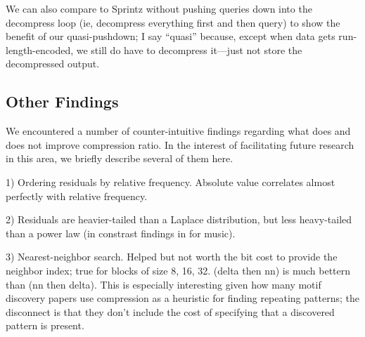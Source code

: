We can also compare to Sprintz without pushing queries down into the decompress loop (ie, decompress everything first and then query) to show the benefit of our quasi-pushdown; I say ``quasi'' because, except when data gets run-length-encoded, we still do have to decompress it---just not store the decompressed output.

\subsection{Other Findings}

We encountered a number of counter-intuitive findings regarding what does and does not improve compression ratio. In the interest of facilitating future research in this area, we briefly describe several of them here.

1) Ordering residuals by relative frequency. Absolute value correlates almost perfectly with relative frequency. %

2) Residuals are heavier-tailed than a Laplace distribution, but less heavy-tailed than a power law (in constrast findings in \cite{shorten} for music).

3) Nearest-neighbor search. Helped but not worth the bit cost to provide the neighbor index; true for blocks of size 8, 16, 32. (delta then nn) is much bettern than (nn then delta). This is especially interesting given how many motif discovery papers use compression as a heuristic for finding repeating patterns; the disconnect is that they don't include the cost of specifying that a discovered pattern is present.

